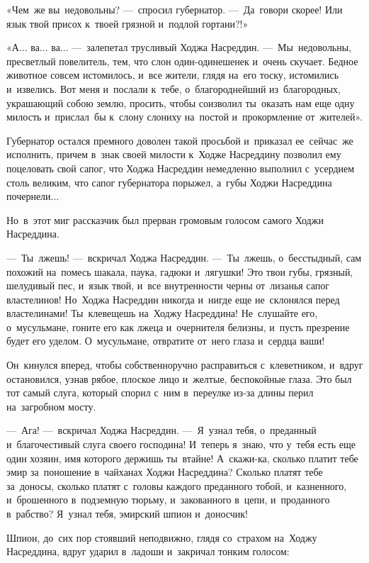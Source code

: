 \documentclass[12pt,a4paper]{book}
\begin{document}
«Чем~же вы~недовольны? —~спросил губернатор. —~Да~говори скорее! Или язык твой присох к~твоей грязной и~подлой гортани?!»

«А... ва... ва... —~залепетал трусливый Ходжа Насреддин. —~Мы~недовольны, пресветлый повелитель, тем, что слон один-одинешенек и~очень скучает. Бедное животное совсем истомилось, и~все жители, глядя на~его тоску, истомились и~извелись. Вот меня и~послали к~тебе, о~благороднейший из~благородных, украшающий собою землю, просить, чтобы соизволил ты~оказать нам еще одну милость и~прислал~бы к~слону слониху на~постой и~прокормление от~жителей».

Губернатор остался премного доволен такой просьбой и~приказал ее~сейчас~же исполнить, причем в~знак своей милости к~Ходже Насреддину позволил ему поцеловать свой сапог, что Ходжа Насреддин немедленно выполнил с~усердием столь великим, что сапог губернатора порыжел, а~губы Ходжи Насреддина почернели...

Но~в~этот миг рассказчик был прерван громовым голосом самого Ходжи Насреддина.

—~Ты~лжешь! —~вскричал Ходжа Насреддин. —~Ты~лжешь, о~бесстыдный, сам похожий на~помесь шакала, паука, гадюки и~лягушки! Это твои губы, грязный, шелудивый пес, и~язык твой, и~все внутренности черны от~лизанья сапог властелинов! Но~Ходжа Насреддин никогда и~нигде еще не~склонялся перед властелинами! Ты~клевещешь на~Ходжу Насреддина! Не~слушайте его, о~мусульмане, гоните его как лжеца и~очернителя белизны, и~пусть презрение будет его уделом. О~мусульмане, отвратите от~него глаза и~сердца ваши!

Он~кинулся вперед, чтобы собственноручно расправиться с~клеветником, и~вдруг остановился, узнав рябое, плоское лицо и~желтые, беспокойные глаза. Это был тот самый слуга, который спорил с~ним в~переулке из-за длины перил на~загробном мосту.

—~Ага! —~вскричал Ходжа Насреддин. —~Я~узнал тебя, о~преданный и~благочестивый слуга своего господина! И~теперь я~знаю, что у~тебя есть еще один хозяин, имя которого держишь ты~втайне! А~скажи-ка, сколько платит тебе эмир за~поношение в~чайханах Ходжи Насреддина? Сколько платят тебе за~доносы, сколько платят с~головы каждого преданного тобой, и~казненного, и~брошенного в~подземную тюрьму, и~закованного в~цепи, и~проданного в~рабство? Я~узнал тебя, эмирский шпион и~доносчик!

Шпион, до~сих пор стоявший неподвижно, глядя со~страхом на~Ходжу Насреддина, вдруг ударил в~ладоши и~закричал тонким голосом:
\end{document}
